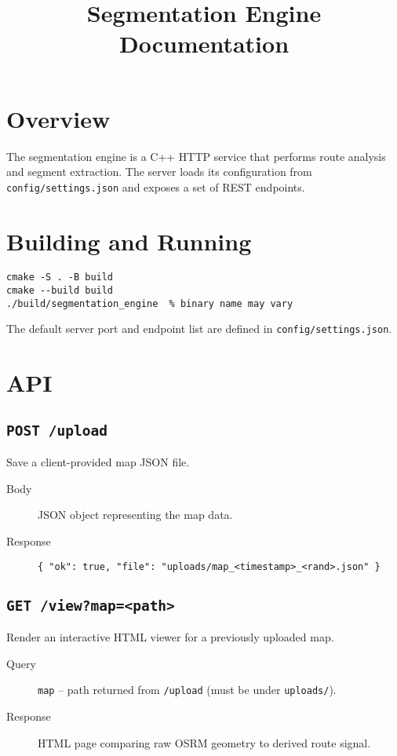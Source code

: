 \documentclass{article}
\begin{document}
\title{Segmentation Engine Documentation}
\author{}
\date{}
\maketitle

\section{Overview}
The segmentation engine is a C++ HTTP service that performs route analysis and segment extraction. The server loads its configuration from \texttt{config/settings.json} and exposes a set of REST endpoints.

\section{Building and Running}
\begin{verbatim}
cmake -S . -B build
cmake --build build
./build/segmentation_engine  % binary name may vary
\end{verbatim}
The default server port and endpoint list are defined in \texttt{config/settings.json}.

\section{API}
\subsection{\texttt{POST /upload}}
Save a client-provided map JSON file.
\begin{description}
\item[Body] JSON object representing the map data.
\item[Response] \texttt{\{ "ok": true, "file": "uploads/map\_<timestamp>\_<rand>.json" \}}
\end{description}

\subsection{\texttt{GET /view?map=<path>}}
Render an interactive HTML viewer for a previously uploaded map.
\begin{description}
\item[Query] \texttt{map} -- path returned from \texttt{/upload} (must be under \texttt{uploads/}).
\item[Response] HTML page comparing raw OSRM geometry to derived route signal.
\end{description}
\end{document}

